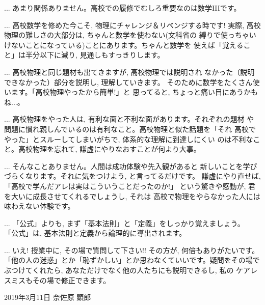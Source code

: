 \begin{faq}{\small{}
... あまり関係ありません。高校での履修でむしろ重要なのは数学IIIです。}\end{faq}

\begin{faq}{\small{}
... 高校数学を修めた今こそ, 物理にチャレンジ＆リベンジする時です! 
実際, 高校物理の難しさの大部分は, ちゃんと数学を使わない(文科省の
縛りで使っちゃいけないことになっている)ことにあります。ちゃんと数学を
使えば「覚えること」は半分以下に減り, 見通しもすっきりします。}\end{faq}

\begin{faq}{\small{}
... 高校物理と同じ題材も出てきますが, 高校物理では説明され
なかった（説明できなかった）部分を説明し, 理解していきます。
そのために数学をたくさん使います。「高校物理やったから簡単!」と
思ってると, ちょっと痛い目にあうかもね...。}\end{faq}

\begin{faq}{\small{}
... 高校物理をやった人は, 有利な面と不利な面があります。それぞれの題材
や問題に慣れ親しんでいるのは有利なこと。高校物理と似た話題を「それ
高校でやった」とスルーしてしまいがちで, 体系的な理解に到達しにくい
のは不利なこと。高校物理を忘れて, 謙虚にやりなおすことが何より大事。}\end{faq}

\begin{faq}{\small{}
... そんなことありません。人間は成功体験や先入観があると
新しいことを学びづらくなります。それに気をつけよう, と言ってるだけです。
謙虚にやり直せば, 「高校で学んだアレは実はこういうことだったのか!」
という驚きや感動が, 君を大いに成長させてくれるでしょうし, それは
高校で物理をやらなかった人には味わえない体験です。}\end{faq}

\begin{faq}{\small{} ... 
「公式」よりも, まず「基本法則」と「定義」をしっかり覚えましょう。
「公式」は, 基本法則と定義から論理的に導出されます。}\end{faq}

\begin{faq}{\small{} ... 
いえ! 授業中に, その場で質問して下さい!! その方が, 何倍もありがたいです。
「他の人の迷惑」とか「恥ずかしい」とか思わなくていいです。疑問をその場で
ぶつけてくれたら, あなただけでなく他の人たちにも説明できるし, 私の
ケアレスミスもその場で修正できます。}\end{faq}
\hv

2019年3月11日 奈佐原 顕郎
